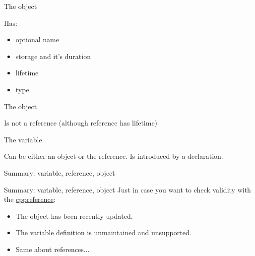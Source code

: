 \documentclass{panicsoftware-presentation}
\makeatletter
\newenvironment{itemizeSeq}{\begin{itemize}[<+-|alert@+>]}{\end{itemize}}
\makeatother
\begin{document}
\begin{frame}{The object}

Has:
\begin{itemizeSeq}
	\item optional name
	\item storage and it's duration
	\item lifetime
	\item type
\end{itemizeSeq}

\end{frame}

\begin{frame}{The object}

\centerline{Is not a reference {\scriptsize(although reference has lifetime)}}

\end{frame}

\begin{frame}{The variable}

\centerline{Can be either an object or the reference. \pause\alert{Is introduced by a declaration.}}

\end{frame}

\begin{frame}{Summary: variable, reference, object}
\centering
\begin{figure}

\end{figure}

\end{frame}


\begin{frame}{Summary: variable, reference, object}
	Just in case you want to check validity with the \href{http://cppreference.com}{\alert{cppreference}}:

	\begin{itemizeSeq}
		\item The object has been recently updated.
		\item The variable definition is unmaintained and unsupported.
		\item Same about references...
	\end{itemizeSeq}
\end{frame}
\end{document}
